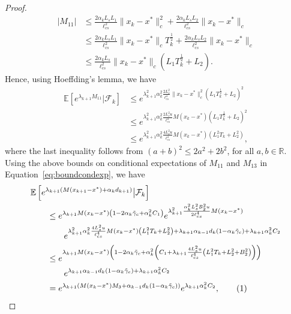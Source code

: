 \documentclass[10pt,a4paper]{amsart}
\newcommand{\E}[1]{\mathbb{E}\lrs{#1}}
\newcommand{\R}{\mathbb{R}}
\newcommand{\lcs}{\ell_{cs}}
\newcommand{\lrp}[1]{\left( #1 \right)}
\newcommand{\lrs}[1]{\left[ #1 \right]}
\newcommand{\numberthis}{\addtocounter{equation}{1}\tag{\theequation}}
\newcommand{\xk}{x_k}
\begin{document}
\begin{proof}
    \begin{align*} |M_{11}| &\le \frac{2\alpha_k L_s L_1}{\lcs^2}\|\xk- x^*\|^2_c + \frac{2\alpha_k L_s L_2}{\lcs^2}\|\xk-x^*\|_c \\
    &\le \frac{2\alpha_k L_s L_1}{\lcs^2}\|\xk- x^*\|_c T^\frac{1}{2}_k + \frac{2\alpha_k L_s L_2}{\lcs^2}\|\xk-x^*\|_c \\
    &\le \frac{2\alpha_k L_s}{\lcs^2}\|\xk- x^*\|_c  \lrp{L_1 T^\frac{1}{2}_k + L_2}. 
    \end{align*}
    Hence, using Hoeffding's lemma, we have
    \begin{align*}
    \E{e^{\lambda_{k+1} M_{11}} \big| \mathcal F_k} 
        &\le e^{\lambda^2_{k+1}\alpha^2_k \frac{2 L^2_s}{\lcs^4}\|x_k - x^*\|^2_c\lrp{L_1 T^\frac{1}{2}_k + L_2}^2}\\
        &\le e^{ \lambda^2_{k+1} \alpha^2_k 
        \frac{2L^2_s u}{\lcs^4} M(x_k - x^*) \lrp{L_1 T^\frac{1}{2}_k + L_2}^2 }\\
        &\le e^{ \lambda^2_{k+1} \alpha^2_k \frac{4 L^2_s u }{\lcs^4}   M(x_k - x^*) \lrp{L^2_1 T_k + L^2_2} },
    \end{align*}
    where the last inequality follows from $(a+b)^2 \le 2a^2 + 2b^2$, for all $a,b\in \R$.  Using the above bounds on conditional expectations of $M_{11}$ and $M_{13}$  in Equation~\eqref{eq:boundcondexp}, we have    
    \begin{align*}
        &\E{ e^{\lambda_{k+1}\lrp{M(x_{k+1} - x^*) + \alpha_k d_{k+1}}} \big| \mathcal F_k } \\
        &\qquad\le e^{\lambda_{k+1} M(\xk - x^*) \lrp{1 - 2\alpha_k\tilde{\gamma}_c + \alpha^2_k C_1 }} e^{\lambda^2_{k+1} \frac{\alpha^2_k L^2_s B^2_2 u}{2\lcs^4} M(\xk - x^*) } \\
        &\qquad\qquad e^{\lambda^2_{k+1} \alpha^2_k \frac{4 L^2_s u }{\lcs^4}   M(x_k - x^*) \lrp{L^2_1 T_k+ L^2_2}  + \lambda_{k+1}\alpha_{k-1}d_k (1-\alpha_k \tilde{\gamma}_c) + \lambda_{k+1}\alpha^2_k C_2}\\
        &\qquad \le  e^{\lambda_{k+1} M(\xk - x^*) \lrp{1 - 2\alpha_k\tilde{\gamma}_c + \alpha^2_k \lrp{  C_1 + \lambda_{k+1}  \frac{4 L^2_s u}{\lcs^4}\lrp{L^2_1 T_k + L^2_2 + B^2_2 } }}} \\
        &\qquad\qquad e^{\lambda_{k+1}\alpha_{k-1}d_k (1-\alpha_k \tilde{\gamma}_c) + \lambda_{k+1}\alpha^2_k C_2}\\
        &\qquad =  e^{ \lambda_{k+1}\lrp{M(\xk - x^*) M_3 + \alpha_{k-1}d_k (1-\alpha_k \tilde{\gamma}_c) }} e^{\lambda_{k+1} \alpha^2_k C_2}, \numberthis \label{eq:condbound1}

\end{align*}
\end{proof}
\end{document}
